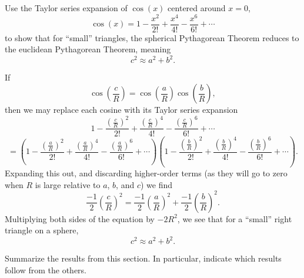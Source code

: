 \documentclass{ximera}
\begin{document}
\begin{problem}
  Use the Taylor series expansion of $\cos(x)$ centered around $x=0$,
  \[
  \cos(x) = 1 - \frac{x^2}{2!} + \frac{x^4}{4!} - \frac{x^6}{6!} + \cdots
  \]
to show that for ``small'' triangles, the spherical Pythagorean
Theorem reduces to the euclidean Pythagorean Theorem, meaning
\[
c^2 \approx a^2+b^2.
\]
\begin{freeResponse}
  If
  \[
  \cos\left(\frac{c}{R}\right)=\cos\left(\frac{a}{R}\right)\cos\left(\frac{b}{R}\right),
  \]
  then we may replace each cosine with its Taylor series expansion
  \[
  1 - \frac{\left(\frac{c}{R}\right)^2}{2!} + \frac{\left(\frac{c}{R}\right)^4}{4!} - \frac{\left(\frac{c}{R}\right)^6}{6!} + \cdots
  \]
  \[
  =\left(
  1 - \frac{\left(\frac{a}{R}\right)^2}{2!} + \frac{\left(\frac{a}{R}\right)^4}{4!} - \frac{\left(\frac{a}{R}\right)^6}{6!} + \cdots
  \right)
  \left(
  1 - \frac{\left(\frac{b}{R}\right)^2}{2!} + \frac{\left(\frac{b}{R}\right)^4}{4!} - \frac{\left(\frac{b}{R}\right)^6}{6!} + \cdots
  \right).
  \]
  Expanding this out, and discarding higher-order terms (as they will
  go to zero when $R$ is large relative to $a$, $b$, and $c$) we find
  \[
  \frac{-1}{2}\left(\frac{c}{R}\right)^2 = \frac{-1}{2}\left(\frac{a}{R}\right)^2+\frac{-1}{2}\left(\frac{b}{R}\right)^2.
  \]
  Multiplying both sides of the equation by $-2R^2$, we see that for a
  ``small'' right triangle on a sphere,
  \[
  c^2 \approx a^2 +b^2.
  \]
\end{freeResponse}
\end{problem}


\begin{problem}
Summarize the results from this section. In particular, indicate which
results follow from the others.
\begin{freeResponse}
\end{freeResponse}
\end{problem}
\end{document}
